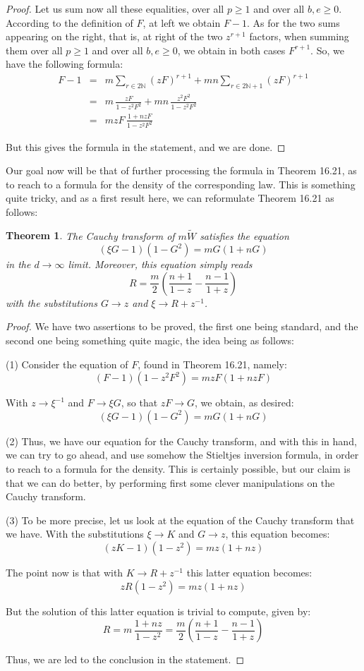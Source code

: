 \documentclass[12pt]{amsbook}
\newtheorem{theorem}{Theorem}[chapter]
\begin{document}
\begin{proof}
Let us sum now all these equalities, over all $p\geq 1$ and over all $b,e\geq 0$. According to the definition of $F$, at left we obtain $F-1$. As for the two sums appearing on the right, that is, at right of the two $z^{r+1}$ factors, when summing them over all $p\geq 1$ and over all $b,e\geq 0$, we obtain in both cases $F^{r+1}$. So, we have the following formula:
\begin{eqnarray*}
F-1
&=&m\sum_{r\in 2\mathbb N}(zF)^{r+1}+mn\sum_{r\in 2\mathbb N+1}(zF)^{r+1}\\
&=&m\,\frac{zF}{1-z^2F^2}+mn\,\frac{z^2F^2}{1-z^2F^2}\\
&=&mzF\,\frac{1+nzF}{1-z^2F^2}
\end{eqnarray*}

But this gives the formula in the statement, and we are done.
\end{proof}

Our goal now will be that of further processing the formula in Theorem 16.21, as to reach to a formula for the density of the corresponding law. This is something quite tricky, and as a first result here, we can reformulate Theorem 16.21 as follows:

\begin{theorem}
The Cauchy transform of $m\widetilde{W}$ satisfies the equation
$$(\xi G-1)(1-G^2)=mG(1+nG)$$
in the $d\to\infty$ limit. Moreover, this equation simply reads
$$R=\frac{m}{2}\left(\frac{n+1}{1-z}-\frac{n-1}{1+z}\right)$$
with the substitutions $G\to z$ and $\xi\to R+z^{-1}$.
\end{theorem}

\begin{proof}
We have two assertions to be proved, the first one being standard, and the second one being something quite magic, the idea being as follows:

\medskip

(1) Consider the equation of $F$, found in Theorem 16.21, namely:
$$(F-1)(1-z^2F^2)=mzF(1+nzF)$$

With $z\to\xi^{-1}$ and $F\to\xi G$, so that $zF\to G$, we obtain, as desired:
$$(\xi G-1)(1-G^2)=mG(1+nG)$$

(2) Thus, we have our equation for the Cauchy transform, and with this in hand, we can try to go ahead, and use somehow the Stieltjes inversion formula, in order to reach to a formula for the density. This is certainly possible, but our claim is that we can do better, by performing first some clever manipulations on the Cauchy transform.

\medskip

(3) To be more precise, let us look at the equation of the Cauchy transform that we have. With the substitutions $\xi \to K$ and $G\to z$, this equation becomes:
$$(zK-1)(1-z^2)=mz(1+nz)$$

The point now is that with $K\to R+z^{-1}$ this latter equation becomes:
$$zR(1-z^2)=mz(1+nz)$$

But the solution of this latter equation is trivial to compute, given by:
$$R=m\,\frac{1+nz}{1-z^2}=\frac{m}{2}\left(\frac{n+1}{1-z}-\frac{n-1}{1+z}\right)$$

Thus, we are led to the conclusion in the statement.
\end{proof}
\end{document}
